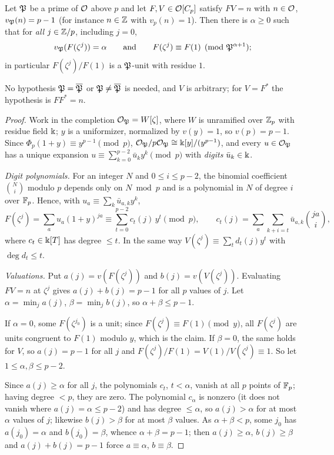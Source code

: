 \begin{lemma}[Lemma~A]\label{lem:A}
Let $\mathfrak{P}$ be a prime of $\mathcal{O}$ above $p$ and let $F,V\in\mathcal{O}[C_p]$ satisfy
$FV=n$ with $n\in\mathcal{O}$, $v_{\mathfrak{P}}(n)=p-1$ (for instance $n\in\mathbb{Z}$ with
$v_p(n)=1$). Then there is $\alpha\ge0$ such that for \emph{all}
$j\in\mathbb{Z}/p$, including $j=0$,
\[
 v_{\mathfrak{P}}(F(\zeta^j))=\alpha\qquad\text{and}\qquad
 F(\zeta^j)\equiv F(1)\pmod{\mathfrak{P}^{\alpha+1}};
\]
in particular $F(\zeta^j)/F(1)$ is a $\mathfrak{P}$-unit with residue $1$.
\end{lemma}

No hypothesis $\mathfrak{P}=\overline{\mathfrak{P}}$ or $\mathfrak{P}\ne\overline{\mathfrak{P}}$ is needed, and $V$ is
arbitrary; for $V=F^*$ the hypothesis is $FF^*=n$.

\begin{proof}
Work in the completion $\mathcal{O}_{\mathfrak{P}}=W[\zeta]$, where $W$ is unramified over
$\mathbb{Z}_p$ with residue field $\Bbbk$; $y$ is a uniformizer, normalized by
$v(y)=1$, so $v(p)=p-1$. Since $\Phi_p(1+y)\equiv y^{p-1}\pmod p$,
$\mathcal{O}_{\mathfrak{P}}/p\mathcal{O}_{\mathfrak{P}}\cong\Bbbk[y]/(y^{p-1})$, and every $u\in\mathcal{O}_{\mathfrak{P}}$ has a
unique expansion $u\equiv\sum_{k=0}^{p-2}\bar u_ky^k\pmod p$ with
\emph{digits} $\bar u_k\in\Bbbk$.

\emph{Digit polynomials.} For an integer $N$ and $0\le i\le p-2$, the
binomial coefficient $\binom Ni$ modulo $p$ depends only on $N\bmod p$
and is a polynomial in $N$ of degree $i$ over $\mathbb{F}_p$. Hence, with
$u_a\equiv\sum_k\bar u_{a,k}y^k$,
\[
 F(\zeta^j)=\sum_au_a(1+y)^{ja}\equiv\sum_{t=0}^{p-2}c_t(j)\,y^t
 \pmod p,\qquad c_t(j)=\sum_a\sum_{k+i=t}\bar u_{a,k}\binom{ja}{i},
\]
where $c_t\in\Bbbk[T]$ has degree $\le t$. In the same way
$V(\zeta^j)\equiv\sum_td_t(j)y^t$ with $\deg d_t\le t$.

\emph{Valuations.} Put $a(j)=v(F(\zeta^j))$ and $b(j)=v(V(\zeta^j))$.
Evaluating $FV=n$ at $\zeta^j$ gives $a(j)+b(j)=p-1$ for all $p$ values of
$j$. Let $\alpha=\min_ja(j)$, $\beta=\min_jb(j)$, so $\alpha+\beta\le
p-1$.

If $\alpha=0$, some $F(\zeta^{j_0})$ is a unit; since $F(\zeta^j)\equiv
F(1)\pmod y$, all $F(\zeta^j)$ are units congruent to $F(1)$ modulo $y$,
which is the claim. If $\beta=0$, the same holds for $V$, so $a(j)=p-1$
for all $j$ and $F(\zeta^j)/F(1)=V(1)/V(\zeta^j)\equiv1$. So let
$1\le\alpha,\beta\le p-2$.

Since $a(j)\ge\alpha$ for all $j$, the polynomials $c_t$, $t<\alpha$,
vanish at all $p$ points of $\mathbb{F}_p$; having degree $<p$, they are zero.
The polynomial $c_\alpha$ is nonzero (it does not vanish where
$a(j)=\alpha\le p-2$) and has degree $\le\alpha$, so $a(j)>\alpha$ for at
most $\alpha$ values of $j$; likewise $b(j)>\beta$ for at most $\beta$
values. As $\alpha+\beta<p$, some $j_0$ has $a(j_0)=\alpha$ and
$b(j_0)=\beta$, whence $\alpha+\beta=p-1$; then $a(j)\ge\alpha$,
$b(j)\ge\beta$ and $a(j)+b(j)=p-1$ force $a\equiv\alpha$, $b\equiv\beta$.


\end{proof}

